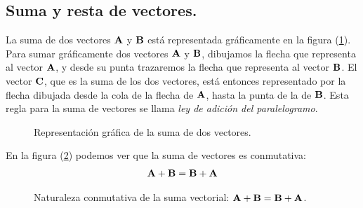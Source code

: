 \documentclass[12pt]{article}
\begin{document}
\subsection{Suma y resta de vectores.}

La suma de dos vectores $\vb{A}$ y $\vb{B}$ está representada gráficamente en la figura (\ref{fig:figura_01_02}). Para sumar gráficamente dos vectores $\vb{A}$ y $\vb{B}$, dibujamos la flecha que representa al vector $\vb{A}$, y desde su punta trazaremos la flecha que representa al vector $\vb{B}$. El vector $\vb{C}$, que es la suma de los dos vectores, está entonces representado por la flecha dibujada desde la cola de la flecha de $\vb{A}$, hasta la punta de la de $\vb{B}$. Esta regla para la suma de vectores se llama \emph{ley de adición del paralelogramo}.
\begin{figure}[H]
    \centering
    \caption{Representación gráfica de la suma de dos vectores.}
    \label{fig:figura_01_02}
\end{figure}
En la figura (\ref{fig:figura_01_03}) podemos ver que la suma de vectores es conmutativa:
\begin{align*}
    \vb{A} + \vb{B} = \vb{B} + \vb{A}
\end{align*}
\begin{figure}[H]
    \centering
    \caption{Naturaleza conmutativa de la suma vectorial: $\vb{A} + \vb{B} = \vb{B} + \vb{A}$.}
    \label{fig:figura_01_03}
\end{figure}
\end{document}
